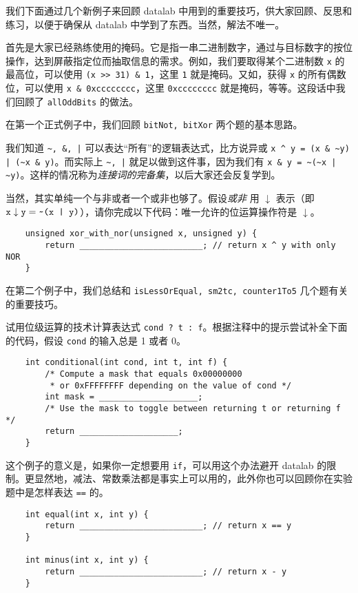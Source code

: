     我们下面通过几个新例子来回顾 datalab 中用到的重要技巧，供大家回顾、反思和练习，以便于确保从 datalab 中学到了东西。当然，解法不唯一。

    首先是大家已经熟练使用的掩码。它是指一串二进制数字，通过与目标数字的按位操作，达到屏蔽指定位而抽取信息的需求。例如，我们要取得某个二进制数 \texttt{x} 的最高位，可以使用 \verb|(x >> 31) & 1|，这里 \texttt{1} 就是掩码。又如，获得 \texttt{x} 的所有偶数位，可以使用 \verb|x & 0xcccccccc|，这里 \texttt{0xcccccccc} 就是掩码，等等。这段话中我们回顾了 \texttt{allOddBits} 的做法。

    在第一个正式例子中，我们回顾 \texttt{bitNot, bitXor} 两个题的基本思路。
    \begin{example}[de Morgan 律]
        我们知道 \verb+~, &, |+ 可以表达“所有”的逻辑表达式，比方说异或 \verb+x ^ y = (x & ~y) | (~x & y)+。而实际上 \verb+~, |+ 就足以做到这件事，因为我们有 \verb+x & y = ~(~x | ~y)+。这样的情况称为\emph{连接词的完备集}，以后大家还会反复学到。

        当然，其实单纯一个与非或者一个或非也够了。假设\emph{或非} 用 $\downarrow$ 表示（即 $\texttt{x} \downarrow \texttt{y} = \verb+~(x | y)+$），请你完成以下代码：唯一允许的位运算操作符是 $\downarrow$。
        \begin{verbatim}
    unsigned xor_with_nor(unsigned x, unsigned y) {
        return _________________________; // return x ^ y with only NOR
    }
        \end{verbatim}
    \end{example}

    在第二个例子中，我们总结和 \texttt{isLessOrEqual, sm2tc, counter1To5} 几个题有关的重要技巧。
    \begin{example}[选择器]
        试用位级运算的技术计算表达式 \texttt{cond ? t : f}。根据注释中的提示尝试补全下面的代码，假设 \texttt{cond} 的输入总是 1 或者 0。
        \begin{verbatim}
    int conditional(int cond, int t, int f) {
        /* Compute a mask that equals 0x00000000
         * or 0xFFFFFFFF depending on the value of cond */
        int mask = ____________________;
        /* Use the mask to toggle between returning t or returning f */
        return ____________________;
    }
        \end{verbatim}
        这个例子的意义是，如果你一定想要用 \texttt{if}，可以用这个办法避开 datalab 的限制。更显然地，减法、常数乘法都是事实上可以用的，此外你也可以回顾你在实验题中是怎样表达 \texttt{==} 的。
        \begin{verbatim}
    int equal(int x, int y) {
        return _________________________; // return x == y
    }

    int minus(int x, int y) {
        return _________________________; // return x - y
    }
        \end{verbatim}
    \end{example}

